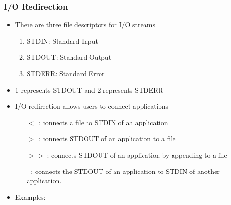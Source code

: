 \documentclass[10pt,t]{beamer}
\begin{document}
\begin{frame}
  \frametitle{I/O Redirection}
  \begin{itemize}
    \item There are three file descriptors for I/O streams
    \begin{enumerate}
        \item STDIN: Standard Input
        \item STDOUT: Standard Output
        \item STDERR: Standard Error
    \end{enumerate}
    \item 1 represents STDOUT and 2 represents STDERR
    \item I/O redirection allows users to connect applications
    \begin{itemize}
      \item[$<$]: connects a file to STDIN of an application
      \item[$>$]: connects STDOUT of an application to a file
      \item[$> >$]: connects STDOUT of an application by appending to a file
      \item[$|$]: connects the STDOUT of an application to STDIN of another application.
    \end{itemize}
    \item Examples:
  \end{itemize}
\end{frame}
\end{document}

